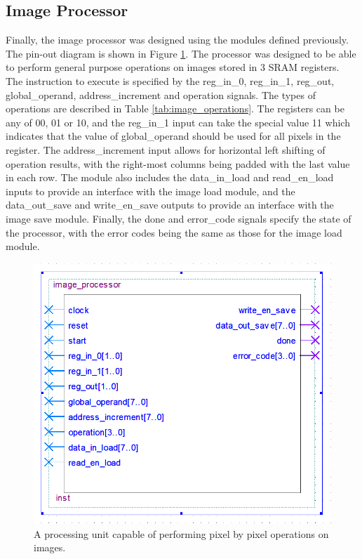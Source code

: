 \documentclass[a4paper, 10pt, titlepage]{article}
\begin{document}
\subsection{Image Processor}

Finally, the image processor was designed using the modules defined previously. The pin-out diagram is shown in Figure \ref{fig:image_processor}. The processor was designed to be able to perform general purpose operations on images stored in 3 SRAM registers. The instruction to execute is specified by the reg\_in\_0, reg\_in\_1, reg\_out, global\_operand, address\_increment and operation signals. The types of operations are described in Table \ref{tab:image_operations}. The registers can be any of 00, 01 or 10, and the reg\_in\_1 input can take the special value 11 which indicates that the value of global\_operand should be used for all pixels in the register. The address\_increment input allows for horizontal left shifting of operation results, with the right-most columns being padded with the last value in each row. The module also includes the data\_in\_load and read\_en\_load inputs to provide an interface with the image load module, and the data\_out\_save and write\_en\_save outputs to provide an interface with the image save module. Finally, the done and error\_code signals specify the state of the processor, with the error codes being the same as those for the image load module.

\begin{figure}[htb]
    \centering
    \includegraphics[width=0.5\linewidth]{image_processor_entity.PNG}
    \caption{A processing unit capable of performing pixel by pixel operations on images.}
    \label{fig:image_processor}
\end{figure}
\end{document}
